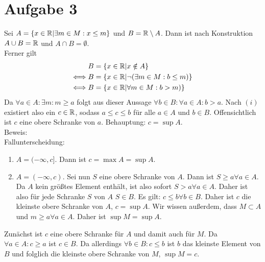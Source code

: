 \documentclass{article}
\begin{document}
	\section*{Aufgabe 3}
	Sei $A = \{x\in \mathbb{R}| \exists m \in M: x\leq m\}$ und $B = \mathbb{R}\setminus A$. Dann ist nach Konstruktion $A \cup B = \mathbb{R}$ und $A\cap B= \emptyset$. \\
	Ferner gilt 
	\begin{align*}
		B &= \{x\in \mathbb{R}| x\notin A\}\\
		\Longleftrightarrow B&= \{x\in \mathbb{R}| \neg (\exists m \in M: b\leq m)\}\\
		\Longleftrightarrow B&= \{x\in \mathbb{R}| \forall m \in M: b>m)\}\\
	\end{align*}
	Da $\forall a\in A: \exists m: m\geq a$ folgt aus dieser Aussage  $\forall b\in B: \forall a\in A: b> a$.
	Nach $(i)$ existiert also ein $c\in \mathbb{R}$, sodass $a\leq c\leq b$ für alle $a\in A$ und $b\in B$. Offensichtlich ist $c$ eine obere Schranke von $a$. 
	Behauptung: $c = \sup A$.\\
	Beweis:\\
	Fallunterscheidung: 
	\begin{enumerate}[1)]
		\item $A = (-\infty, c]$. Dann ist $c = \max A = \sup A$.
		\item $A = (-\infty, c)$. Sei nun $S$ eine obere Schranke von $A$. Dann ist $S\geq a\forall a\in A$. Da $A$ kein größtes Element enthält, ist also sofort $S > a\forall a\in A$. Daher ist also für jede Schranke $S$ von $A$ $S\in B$.
	Es gilt: $c \leq b\forall b\in B$. Daher ist $c$ die kleinste obere Schranke von $A$, $c = \sup A$.
	Wir wissen außerdem, dass $M\subset A$ und $m\geq a\forall a\in A$. Daher ist $\sup M = \sup A$.
	\end{enumerate}
	Zunächst ist $c$ eine obere Schranke für $A$ und damit auch für $M$.
	Da $\forall a \in A: c \geq a$ ist $c \in B$. Da allerdings $\forall b\in B: c\leq b$ ist $b$ das kleinste Element von $B$ und folglich die kleinste obere Schranke von $M$, $\sup M = c$.	
\end{document}
